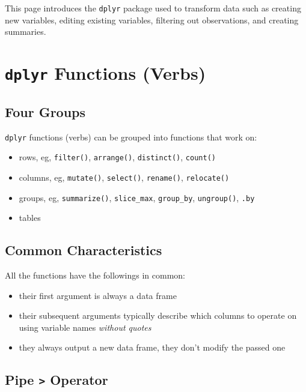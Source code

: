 \documentclass[
  letterpaper,
  DIV=11,
  numbers=noendperiod]{scrreprt}
\providecommand{\tightlist}{%
  \setlength{\itemsep}{0pt}\setlength{\parskip}{0pt}}\usepackage{longtable,booktabs,array}
\begin{document}
This page introduces the \texttt{dplyr} package used to transform data
such as creating new variables, editing existing variables, filtering
out observations, and creating summaries.

\section{\texorpdfstring{\texttt{dplyr} Functions
(Verbs)}{dplyr Functions (Verbs)}}\label{dplyr-functions-verbs}

\subsection{Four Groups}\label{four-groups}

\texttt{dplyr} functions (verbs) can be grouped into functions that work
on:

\begin{itemize}
\tightlist
\item
  rows, eg, \texttt{filter()}, \texttt{arrange()}, \texttt{distinct()},
  \texttt{count()}
\item
  columns, eg, \texttt{mutate()}, \texttt{select()}, \texttt{rename()},
  \texttt{relocate()}
\item
  groups, eg, \texttt{summarize()}, \texttt{slice\_max},
  \texttt{group\_by}, \texttt{ungroup()}, \texttt{.by}
\item
  tables
\end{itemize}

\subsection{Common Characteristics}\label{common-characteristics}

All the functions have the followings in common:

\begin{itemize}
\tightlist
\item
  their first argument is always a data frame
\item
  their subsequent arguments typically describe which columns to operate
  on using variable names \emph{without quotes}
\item
  they always output a new data frame, they don't modify the passed one
\end{itemize}

\subsection{\texorpdfstring{Pipe \texttt{\textbar{}\textgreater{}}
Operator}{Pipe \textbar\textgreater{} Operator}}\label{pipe-operator}
\end{document}
